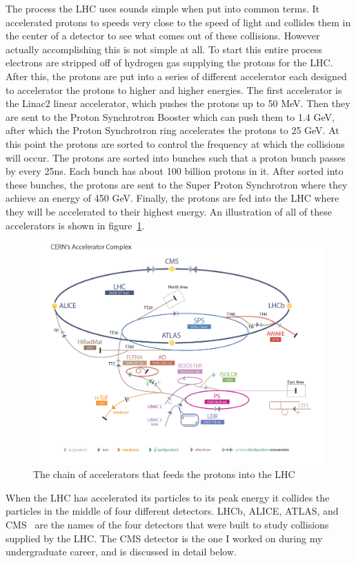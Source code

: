 The process the LHC uses sounds simple when put into common terms. It accelerated protons to speeds very close to the speed of light and collides them in the center of a detector to see what comes out of these collisions. However actually accomplishing this is not simple at all. To start this entire process electrons are stripped off of hydrogen gas supplying the protons for the LHC. After this, the protons are put into a series of different accelerator each designed to accelerator the protons to higher and higher energies. The first accelerator is the Linac2 linear accelerator, which pushes the protons up to 50 MeV. Then they are sent to the Proton Synchrotron Booster which can push them to 1.4 GeV, after which the Proton Synchrotron ring accelerates the protons to 25 GeV. At this point the protons are sorted to control the frequency at which the collisions will occur. The protons are sorted into bunches such that a proton bunch passes by every 25ns. Each bunch has about 100 billion protons in it. After sorted into these bunches, the protons are sent to the Super Proton Synchrotron where they achieve an energy of 450 GeV. Finally, the protons are fed into the LHC where they will be accelerated to their highest energy. An illustration of all of these accelerators is shown in figure~\ref{fig:acceleratorcomplex}.

\begin{figure}
\centering
\includegraphics[width=0.8\linewidth]{Figures/acceleratorcomplex.jpg}
\caption{The chain of accelerators that feeds the protons into the LHC}
\label{fig:acceleratorcomplex}
\end{figure}

When the LHC has accelerated its particles to its peak energy it collides the particles in the middle of four different detectors. LHCb, ALICE, ATLAS, and CMS~\cite{CMS} are the names of the four detectors that were built to study collisions supplied by the LHC. The CMS detector is the one I worked on during my undergraduate career, and is discussed in detail below.

